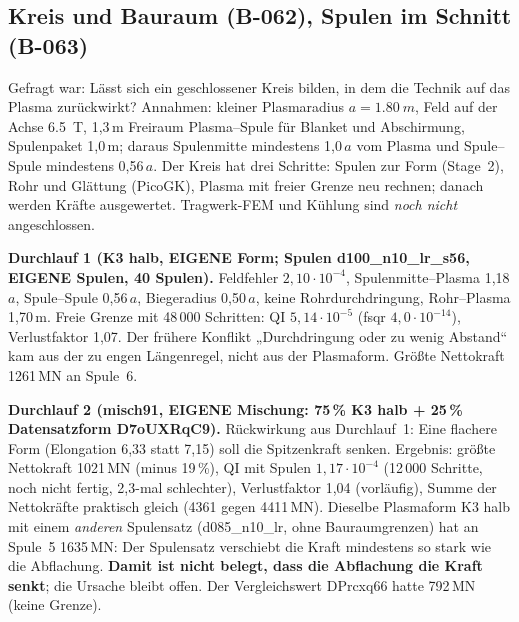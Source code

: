 \subsection{Kreis und Bauraum (B-062), Spulen im Schnitt (B-063)}
Gefragt war: Lässt sich ein geschlossener Kreis bilden, in dem die Technik auf das Plasma zurückwirkt? Annahmen: kleiner Plasmaradius $a=\SI{1,80}{m}$, Feld auf der Achse \SI{6,5}{T}, 1,3\,m Freiraum Plasma--Spule für Blanket und Abschirmung, Spulenpaket 1,0\,m;
daraus Spulenmitte mindestens 1,0\,$a$ vom Plasma und Spule--Spule mindestens 0,56\,$a$. Der Kreis hat drei Schritte: Spulen zur Form (Stage~2), Rohr und Glättung (PicoGK), Plasma mit freier Grenze neu rechnen; danach werden Kräfte ausgewertet.
Tragwerk-FEM und Kühlung sind \emph{noch nicht} angeschlossen.

\textbf{Durchlauf 1 (K3 halb, EIGENE Form; Spulen d100\_n10\_lr\_s56, EIGENE Spulen, 40 Spulen).} Feldfehler $2{,}10\cdot10^{-4}$, Spulenmitte--Plasma 1,18\,$a$, Spule--Spule 0,56\,$a$, Biegeradius 0,50\,$a$, keine Rohrdurchdringung, Rohr--Plasma 1,70\,m. Freie Grenze mit
48\,000 Schritten: QI $5{,}14\cdot10^{-5}$ (fsqr $4{,}0\cdot10^{-14}$), Verlustfaktor 1,07. Der frühere Konflikt „Durchdringung oder zu wenig Abstand“ kam aus der zu engen Längenregel, nicht aus der Plasmaform. Größte Nettokraft 1261\,MN an Spule~6.

\textbf{Durchlauf 2 (misch91, EIGENE Mischung: 75\,\% K3 halb + 25\,\% Datensatzform D7oUXRqC9).} Rückwirkung aus Durchlauf~1: Eine flachere Form (Elongation 6,33 statt 7,15) soll die Spitzenkraft senken. Ergebnis: größte Nettokraft 1021\,MN (minus 19\,\%), QI mit Spulen $1{,}17\cdot10^{-4}$ (12\,000 Schritte, noch nicht fertig,
2,3-mal schlechter), Verlustfaktor 1,04 (vorläufig), Summe der Nettokräfte praktisch gleich (4361 gegen 4411\,MN). Dieselbe Plasmaform K3 halb mit einem \emph{anderen} Spulensatz (d085\_n10\_lr, ohne Bauraumgrenzen) hat an Spule~5 1635\,MN: Der Spulensatz verschiebt die Kraft mindestens so stark wie
die Abflachung. \textbf{Damit ist nicht belegt, dass die Abflachung die Kraft senkt}; die Ursache bleibt offen. Der Vergleichswert DPrcxq66 hatte 792\,MN (keine Grenze).

